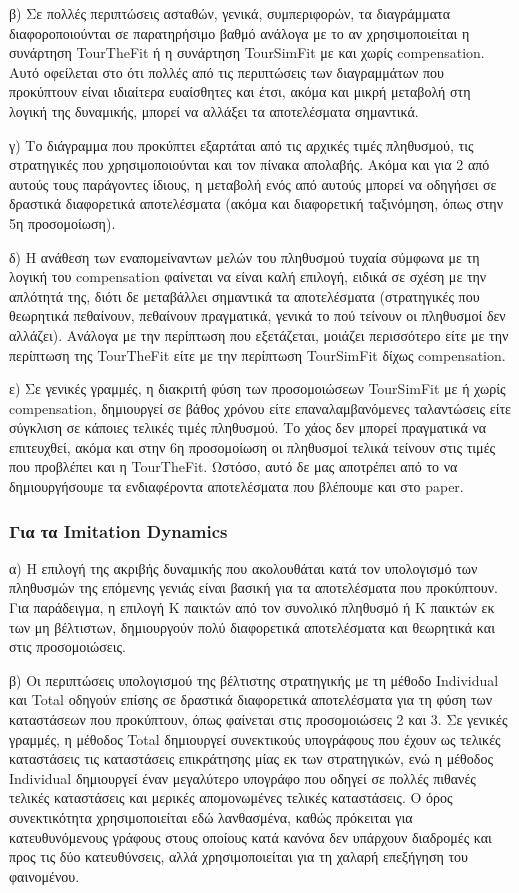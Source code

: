 β) Σε πολλές περιπτώσεις ασταθών, γενικά, συμπεριφορών, τα διαγράμματα διαφοροποιούνται σε παρατηρήσιμο βαθμό ανάλογα με το αν χρησιμοποιείται η συνάρτηση TourTheFit ή η συνάρτηση TourSimFit με και χωρίς compensation. Αυτό οφείλεται στο ότι πολλές από τις περιπτώσεις των διαγραμμάτων που προκύπτουν είναι ιδιαίτερα ευαίσθητες και έτσι, ακόμα και μικρή μεταβολή στη λογική της δυναμικής, μπορεί να αλλάξει τα αποτελέσματα σημαντικά.

γ) Το διάγραμμα που προκύπτει εξαρτάται από τις αρχικές τιμές πληθυσμού, τις στρατηγικές που χρησιμοποιούνται και τον πίνακα απολαβής. Ακόμα και για 2 από αυτούς τους παράγοντες ίδιους, η μεταβολή ενός από αυτούς μπορεί να οδηγήσει σε δραστικά διαφορετικά αποτελέσματα (ακόμα και διαφορετική ταξινόμηση, όπως στην 5η προσομοίωση).

δ) Η ανάθεση των εναπομείναντων μελών του πληθυσμού τυχαία σύμφωνα με τη λογική του compensation φαίνεται να είναι καλή επιλογή, ειδικά σε σχέση με την απλότητά της, διότι δε μεταβάλλει σημαντικά τα αποτελέσματα (στρατηγικές που θεωρητικά πεθαίνουν, πεθαίνουν πραγματικά, γενικά το πού τείνουν οι πληθυσμοί δεν αλλάζει). Ανάλογα με την περίπτωση που εξετάζεται, μοιάζει περισσότερο είτε με την περίπτωση της TourTheFit είτε με την περίπτωση TourSimFit δίχως compensation.

ε) Σε γενικές γραμμές, η διακριτή φύση των προσομοιώσεων TourSimFit με ή χωρίς compensation, δημιουργεί σε βάθος χρόνου είτε επαναλαμβανόμενες ταλαντώσεις είτε σύγκλιση σε κάποιες τελικές τιμές πληθυσμού. Το χάος δεν μπορεί πραγματικά να επιτευχθεί, ακόμα και στην 6η προσομοίωση οι πληθυσμοί τελικά τείνουν στις τιμές που προβλέπει και η TourTheFit. Ωστόσο, αυτό δε μας αποτρέπει από το να δημιουργήσουμε τα ενδιαφέροντα αποτελέσματα που βλέπουμε και στο paper.

\subsubsection*{Για τα Imitation Dynamics}
α) Η επιλογή της ακριβής δυναμικής που ακολουθάται κατά τον υπολογισμό των πληθυσμών της επόμενης γενιάς είναι βασική για τα αποτελέσματα που προκύπτουν. Για παράδειγμα, η επιλογή K παικτών από τον συνολικό πληθυσμό ή K παικτών εκ των μη βέλτιστων, δημιουργούν πολύ διαφορετικά αποτελέσματα και θεωρητικά και στις προσομοιώσεις.

β) Οι περιπτώσεις υπολογισμού της βέλτιστης στρατηγικής με τη μέθοδο In\-di\-vi\-du\-al και Total οδηγούν επίσης σε δραστικά διαφορετικά αποτελέσματα για τη φύση των καταστάσεων που προκύπτουν, όπως φαίνεται στις προσομοιώσεις 2 και 3. Σε γενικές γραμμές, η μέθοδος Total δημιουργεί συνεκτικούς υπογράφους που έχουν ως τελικές καταστάσεις τις καταστάσεις επικράτησης μίας εκ των στρατηγικών, ενώ η μέθοδος Individual δημιουργεί έναν μεγαλύτερο υπογράφο που οδηγεί σε πολλές πιθανές τελικές καταστάσεις και μερικές απομονωμένες τελικές καταστάσεις. Ο όρος συνεκτικότητα χρησιμοποιείται εδώ λανθασμένα, καθώς πρόκειται για κατευθυνόμενους γράφους στους οποίους κατά κανόνα δεν υπάρχουν διαδρομές και προς τις δύο κατευθύνσεις, αλλά χρησιμοποιείται για τη χαλαρή επεξήγηση του φαινομένου.

